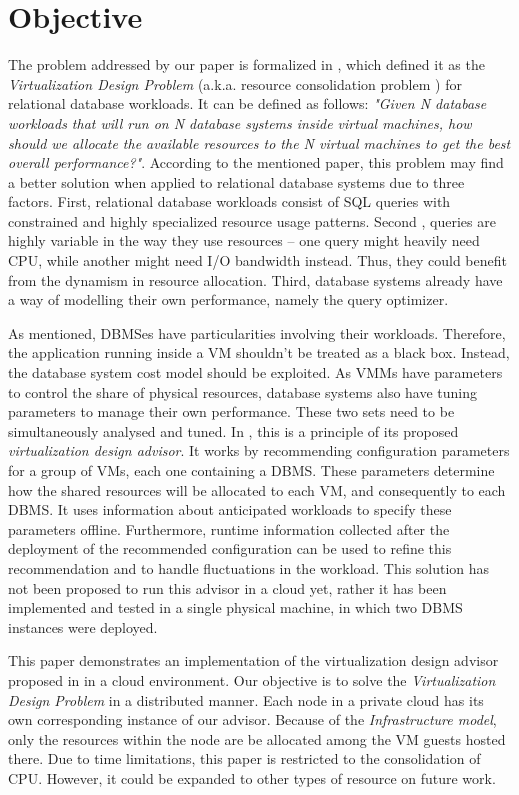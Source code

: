 \section{Objective}

The problem addressed by our paper is formalized in \cite{4401021}, which defined it as the \textit{Virtualization Design Problem} (a.k.a. resource consolidation problem ) for relational database workloads. It can be defined as follows: \textit{"Given N database workloads that will run on N database systems inside virtual 
machines, how should we allocate the available resources to the N virtual machines to get the best overall performance?"}. According to the mentioned paper, this problem may find a better solution when applied to relational database systems due to three factors. First, relational database workloads consist of SQL queries with constrained and highly specialized resource usage patterns. Second , queries are highly variable in the way they use resources -- one query might heavily need CPU, while another might need I/O bandwidth instead. Thus, they could benefit from the dynamism in resource allocation. Third, database systems already have a way of modelling their own performance, namely the query optimizer.

As mentioned, DBMSes have particularities involving their workloads. Therefore, the application running inside a VM shouldn't be treated as a black box. Instead, the database system cost model should be exploited. As VMMs have parameters to control the share of physical resources, database systems also have tuning parameters to manage their own performance. These two sets need to be simultaneously analysed and tuned. In \cite{Soror:2008:AVM:1376616.1376711}, this is a principle of its proposed \textit{virtualization design advisor}. It works by recommending configuration parameters for a group of VMs, each one containing a DBMS. These parameters determine how the shared resources will be allocated to each VM, and consequently to each DBMS. It uses information about anticipated workloads to specify these parameters offline. Furthermore, runtime information collected after the deployment of the recommended configuration can be used to refine this recommendation and to handle fluctuations in the workload. This solution has 
not been proposed to run this advisor in a cloud yet, rather it has been implemented and tested in a single physical machine, in which two DBMS instances were deployed.

This paper demonstrates an implementation of the virtualization design advisor proposed in \cite{Soror:2008:AVM:1376616.1376711} in a cloud environment. Our objective is to solve the \textit{Virtualization Design Problem} in a distributed manner. Each node in a private cloud has its own corresponding instance of our advisor. Because of the \textit{Infrastructure model}, only the resources within the node are be allocated among the VM guests hosted there. Due to time limitations, this paper is restricted to the consolidation of CPU. However, it could be expanded to other types of resource on future work. 

